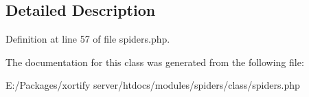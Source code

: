 \subsection{Detailed Description}


Definition at line 57 of file spiders.\-php.



The documentation for this class was generated from the following file\-:\begin{DoxyCompactItemize}
\item 
E\-:/\-Packages/xortify server/htdocs/modules/spiders/class/spiders.\-php\end{DoxyCompactItemize}
